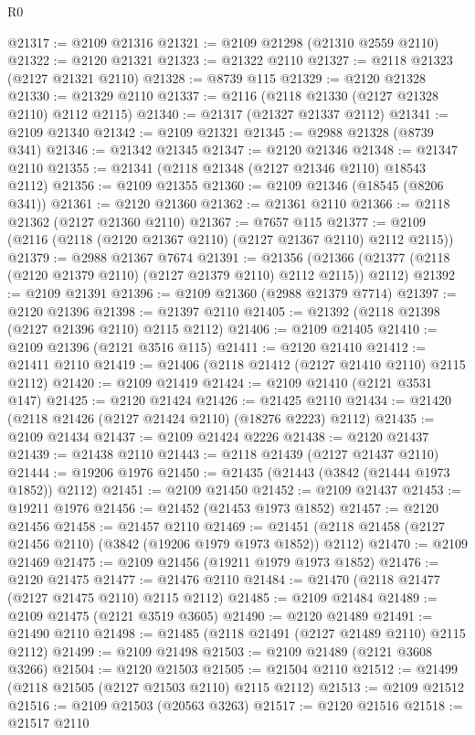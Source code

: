\begin{lexlean}{R0}
\begin{coremodule}
@21317 := @2109 @21316
@21321 := @2109 @21298 (@21310 @2559 @2110)
@21322 := @2120 @21321
@21323 := @21322 @2110
@21327 := @2118 @21323 (@2127 @21321 @2110)
@21328 := @8739 @115
@21329 := @2120 @21328
@21330 := @21329 @2110
@21337 := @2116 (@2118 @21330 (@2127 @21328 @2110) @2112 @2115)
@21340 := @21317 (@21327 @21337 @2112)
@21341 := @2109 @21340
@21342 := @2109 @21321
@21345 := @2988 @21328 (@8739 @341)
@21346 := @21342 @21345
@21347 := @2120 @21346
@21348 := @21347 @2110
@21355 := @21341 (@2118 @21348 (@2127 @21346 @2110) @18543 @2112)
@21356 := @2109 @21355
@21360 := @2109 @21346 (@18545 (@8206 @341))
@21361 := @2120 @21360
@21362 := @21361 @2110
@21366 := @2118 @21362 (@2127 @21360 @2110)
@21367 := @7657 @115
@21377 := @2109 (@2116 (@2118 (@2120 @21367 @2110) (@2127 @21367 @2110) @2112 @2115))
@21379 := @2988 @21367 @7674
@21391 := @21356
    (@21366 (@21377 (@2118 (@2120 @21379 @2110) (@2127 @21379 @2110) @2112 @2115)) @2112)
@21392 := @2109 @21391
@21396 := @2109 @21360 (@2988 @21379 @7714)
@21397 := @2120 @21396
@21398 := @21397 @2110
@21405 := @21392 (@2118 @21398 (@2127 @21396 @2110) @2115 @2112)
@21406 := @2109 @21405
@21410 := @2109 @21396 (@2121 @3516 @115)
@21411 := @2120 @21410
@21412 := @21411 @2110
@21419 := @21406 (@2118 @21412 (@2127 @21410 @2110) @2115 @2112)
@21420 := @2109 @21419
@21424 := @2109 @21410 (@2121 @3531 @147)
@21425 := @2120 @21424
@21426 := @21425 @2110
@21434 := @21420 (@2118 @21426 (@2127 @21424 @2110) (@18276 @2223) @2112)
@21435 := @2109 @21434
@21437 := @2109 @21424 @2226
@21438 := @2120 @21437
@21439 := @21438 @2110
@21443 := @2118 @21439 (@2127 @21437 @2110)
@21444 := @19206 @1976
@21450 := @21435 (@21443 (@3842 (@21444 @1973 @1852)) @2112)
@21451 := @2109 @21450
@21452 := @2109 @21437
@21453 := @19211 @1976
@21456 := @21452 (@21453 @1973 @1852)
@21457 := @2120 @21456
@21458 := @21457 @2110
@21469 := @21451 (@2118 @21458 (@2127 @21456 @2110) (@3842 (@19206 @1979 @1973 @1852)) @2112)
@21470 := @2109 @21469
@21475 := @2109 @21456 (@19211 @1979 @1973 @1852)
@21476 := @2120 @21475
@21477 := @21476 @2110
@21484 := @21470 (@2118 @21477 (@2127 @21475 @2110) @2115 @2112)
@21485 := @2109 @21484
@21489 := @2109 @21475 (@2121 @3519 @3605)
@21490 := @2120 @21489
@21491 := @21490 @2110
@21498 := @21485 (@2118 @21491 (@2127 @21489 @2110) @2115 @2112)
@21499 := @2109 @21498
@21503 := @2109 @21489 (@2121 @3608 @3266)
@21504 := @2120 @21503
@21505 := @21504 @2110
@21512 := @21499 (@2118 @21505 (@2127 @21503 @2110) @2115 @2112)
@21513 := @2109 @21512
@21516 := @2109 @21503 (@20563 @3263)
@21517 := @2120 @21516
@21518 := @21517 @2110

\end{coremodule}
\end{lexlean}
